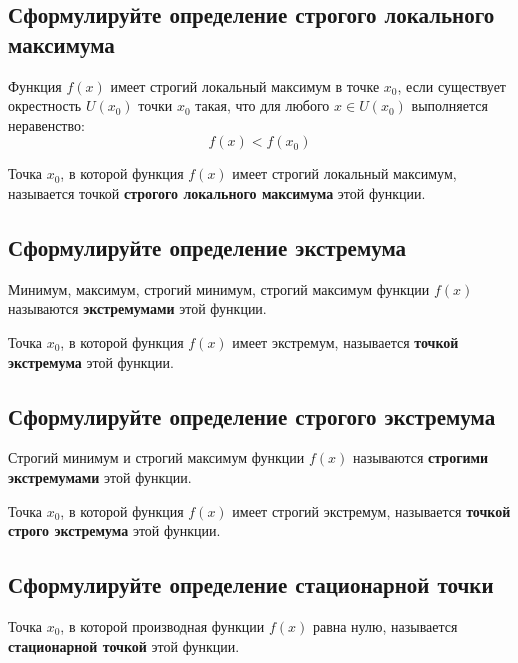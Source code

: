\subsection{Сформулируйте определение строгого локального максимума}
\begin{theorem*}
    Функция $f(x)$ имеет строгий локальный максимум в точке $x_0$, если существует окрестность $U(x_0)$ точки $x_0$ такая, что для любого $x \in U(x_0)$ выполняется неравенство: \[ f(x) < f(x_0) \]
\end{theorem*}
\begin{definition}
    Точка $x_0$, в которой функция $f(x)$ имеет строгий локальный максимум, называется точкой \textbf{строгого локального максимума} этой функции.
\end{definition}

\subsection{Сформулируйте определение экстремума}
\begin{definition}
    Минимум, максимум, строгий минимум, строгий максимум функции $f(x)$ называются \textbf{экстремумами} этой функции.
\end{definition}
\begin{definition*}
    Точка $x_0$, в которой функция $f(x)$ имеет экстремум, называется \textbf{точкой экстремума} этой функции.
\end{definition*}
\subsection{Сформулируйте определение строгого экстремума}
\begin{definition}
    Строгий минимум и строгий максимум функции $f(x)$ называются \textbf{строгими экстремумами} этой функции.
\end{definition}
\begin{definition*}
    Точка $x_0$, в которой функция $f(x)$ имеет строгий экстремум, называется \textbf{точкой строго экстремума} этой функции.
\end{definition*}

\subsection{Сформулируйте определение стационарной точки}
\begin{definition}
    Точка $x_0$, в которой производная функции $f(x)$ равна нулю, называется \textbf{стационарной точкой} этой функции.
\end{definition}
\newpage
